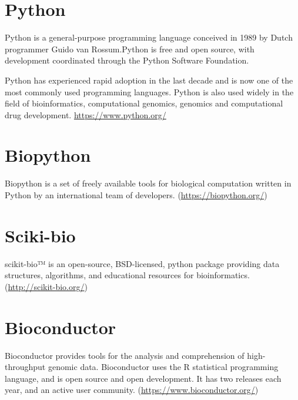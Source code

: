 \section{Python}
Python is a general-purpose programming language conceived in 1989 by Dutch programmer Guido van Rossum.Python is free and open source, with development coordinated through the Python Software Foundation.

Python has experienced rapid adoption in the last decade and is now one of the most commonly used programming languages. Python is also used widely in the field of bioinformatics, computational genomics, genomics and computational drug development. \url{https://www.python.org/} 


\section{Biopython} 
Biopython is a set of freely available tools for biological computation written in Python by an international team of developers. (\url{https://biopython.org/}) 

\section{Sciki-bio} 
scikit-bio™ is an open-source, BSD-licensed, python package providing data structures, algorithms, and educational resources for bioinformatics. (\url{http://scikit-bio.org/}) 

\section{Bioconductor}
Bioconductor provides tools for the analysis and comprehension of high-throughput genomic data. Bioconductor uses the R statistical programming language, and is open source and open development. It has two releases each year, and an active user community. (\url{https://www.bioconductor.org/}) 

